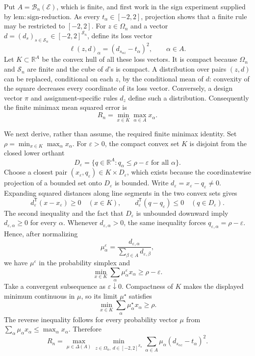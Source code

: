 Put \(A=\mathcal B_n(\mathcal E)\), which is finite, and first work in the sign experiment supplied by \(\mathrm{lem{:}sign\text{-}reduction}\).  As every \(t_\alpha\in[-2,2]\), projection shows that a finite rule may be restricted to \([-2,2]\).  For \(z\in\Omega_n\) and a vector \(d=(d_s)_{s\in\mathcal S_n}\in[-2,2]^{\mathcal S_n}\), define its loss vector
\[
 \ell(z,d)_\alpha=(d_{s_{\alpha z}}-t_\alpha)^2,
 \qquad \alpha\in A.
\]
Let \(K\subset\mathbb R^A\) be the convex hull of all these loss vectors.  It is compact because \(\Omega_n\) and \(\mathcal S_n\) are finite and the cube of \(d\)'s is compact.  A distribution over pairs \((z,d)\) can be replaced, conditional on each \(z\), by the conditional mean of \(d\): convexity of the square decreases every coordinate of its loss vector.  Conversely, a design vector \(\pi\) and assignment-specific rules \(d_z\) define such a distribution.  Consequently the finite minimax mean squared error is
\[
 R_n=\min_{x\in K}\max_{\alpha\in A}x_\alpha.
\]

We next derive, rather than assume, the required finite minimax identity.  Set \(\rho=\min_{x\in K}\max_\alpha x_\alpha\).  For \(\varepsilon>0\), the compact convex set \(K\) is disjoint from the closed lower orthant
\[
 D_\varepsilon=\{q\in\mathbb R^A:q_\alpha\le\rho-\varepsilon\text{ for all }\alpha\}.
\]
Choose a closest pair \((x_\varepsilon,q_\varepsilon)\in K\times D_\varepsilon\), which exists because the coordinatewise projection of a bounded set onto \(D_\varepsilon\) is bounded.  Write \(d_\varepsilon=x_\varepsilon-q_\varepsilon\ne0\).  Expanding squared distances along line segments in the two convex sets gives
\[
 d_\varepsilon^{\mathsf T}(x-x_\varepsilon)\ge0\quad(x\in K),
 \qquad
 d_\varepsilon^{\mathsf T}(q-q_\varepsilon)\le0\quad(q\in D_\varepsilon).
\]
The second inequality and the fact that \(D_\varepsilon\) is unbounded downward imply \(d_{\varepsilon,\alpha}\ge0\) for every \(\alpha\).  Whenever \(d_{\varepsilon,\alpha}>0\), the same inequality forces \(q_{\varepsilon,\alpha}=\rho-\varepsilon\).  Hence, after normalizing
\[
 \mu^\varepsilon_\alpha=
 \frac{d_{\varepsilon,\alpha}}{\sum_{\beta\in A}d_{\varepsilon,\beta}},
\]
we have \(\mu^\varepsilon\) in the probability simplex and
\[
 \min_{x\in K}\sum_\alpha\mu^\varepsilon_\alpha x_\alpha
 \ge \rho-\varepsilon.
\]
Take a convergent subsequence as \(\varepsilon\downarrow0\).  Compactness of \(K\) makes the displayed minimum continuous in \(\mu\), so its limit \(\mu^\star\) satisfies
\[
 \min_{x\in K}\sum_\alpha\mu^\star_\alpha x_\alpha\ge\rho.
\]
The reverse inequality follows for every probability vector \(\mu\) from
\(\sum_\alpha\mu_\alpha x_\alpha\le\max_\alpha x_\alpha\).  Therefore
\[
 R_n
 =\max_{\mu\in\Delta(A)}\min_{z\in\Omega_n,\ d\in[-2,2]^{\mathcal S_n}}
   \sum_{\alpha\in A}\mu_\alpha(d_{s_{\alpha z}}-t_\alpha)^2.
\]

